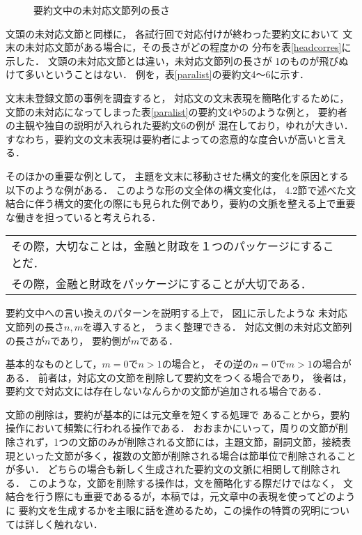 \begin{figure}[htbp]
\begin{center}
\caption{要約文中の未対応文節列の長さ}
\label{inpara}
\end{center}
\end{figure}



文頭の未対応文節と同様に，
各試行回で対応付けが終わった要約文において
文末の未対応文節がある場合に，その長さがどの程度かの
分布を表\ref{headcorres}に示した．
文頭の未対応文節とは違い，未対応文節列の長さが
1のものが飛びぬけて多いということはない．
例を，表\ref{paralist}の要約文4〜6に示す．

文末未登録文節の事例を調査すると，
対応文の文末表現を簡略化するために，
文節の未対応になってしまった表\ref{paralist}の要約文4や5のような例と，
要約者の主観や独自の説明が入れられた要約文6の例が
混在しており，ゆれが大きい．
すなわち，要約文の文末表現は要約者によっての恣意的な度合いが高いと言える．

そのほかの重要な例として，
主題を文末に移動させた構文的変化を原因とする以下のような例がある．
このような形の文全体の構文変化は，
4.2節で述べた文結合に伴う構文的変化の際にも見られた例であり，要約の文脈を整える上で重要な働きを担っていると考えられる．

\begin{center}
\small
\begin{tabular}{lp{}}
その際，大切なことは，金融と財政を１つのパッケージにすることだ．\\
その際，金融と財政をパッケージにすることが大切である．\\
\end{tabular}
\end{center}


要約文中への言い換えのパターンを説明する上で，
図\ref{inpara}に示したような
未対応文節列の長さ$n,m$を導入すると，
うまく整理できる．
対応文側の未対応文節列の長さが$n$であり，
要約側が$m$である．

基本的なものとして，$m=0$で$n>1$の場合と，
その逆の$n=0$で$m>1$の場合がある．
前者は，対応文の文節を削除して要約文をつくる場合であり，
後者は，要約文で対応文には存在しないなんらかの文節が追加される場合である．

文節の削除は，要約が基本的には元文章を短くする処理で
あることから，要約操作において頻繁に行われる操作である．
おおまかにいって，周りの文節が削除されず，1つの文節のみが削除される文節には，主題文節，副詞文節，接続表現といった文節が多く，複数の文節が削除される場合は節単位で削除されることが多い．
どちらの場合も新しく生成された要約文の文脈に相関して削除される．
このような，文節を削除する操作は，文を簡略化する際だけではなく，
文結合を行う際にも重要であるるが，本稿では，元文章中の表現を使ってどのように
要約文を生成するかを主眼に話を進めるため，この操作の特質の究明については詳しく触れない．

